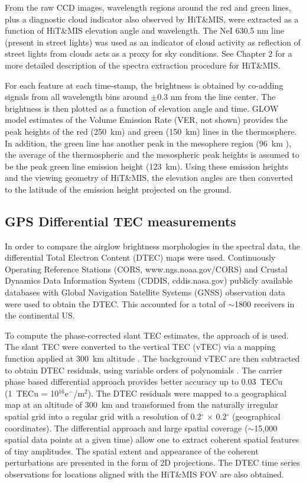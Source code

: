 \documentclass[crop=false,class=mitthesis,oneside,font=12pt]{standalone}
\begin{document}
From the raw CCD images, wavelength regions around the red and green lines, plus a diagnostic cloud indicator also observed by HiT\&MIS, were extracted as a function of HiT\&MIS elevation angle and wavelength.  The NeI 630.5 nm line (present in street lights) was used as an indicator of cloud activity as reflection of street lights from clouds acts as a proxy for sky conditions. See Chapter 2 for a more detailed description of the spectra extraction procedure for HiT\&MIS.

For each feature at each time-stamp, the brightness is obtained by co-adding signals from all wavelength bins around $\pm$0.3 nm from the line center. The brightness is then plotted as a function of elevation angle and time. GLOW \citep{solomon_1988,solomon1989630,bailey2002} model estimates of the Volume Emission Rate (VER, not shown) provides the peak heights of the red (250~km) and green (150~km) lines in the thermosphere. In addition, the green line has another peak in the mesophere region (96~km \citep{yee1987}), the average of the thermospheric and the mesospheric peak heights is assumed to be the peak green line emission height (123~km). Using these emission heights and the viewing geometry of HiT\&MIS, the elevation angles are then converted to the latitude of the emission height projected on the ground. 

\subsection{GPS Differential TEC measurements}
\label{tec}
In order to compare the airglow brightness morphologies in the spectral data, the differential Total Electron Content (DTEC) maps were used. Continuously Operating Reference Stations (CORS, www.ngs.noaa.gov/CORS) and Crustal Dynamics Data Information System (CDDIS, cddis.nasa.gov) publicly available databases with Global Navigation Satellite Systems (GNSS) observation data were used to obtain the DTEC. This accounted for a total of  $\sim$1800 receivers in the continental US. 

To compute the phase-corrected slant TEC estimates, the approach of \cite{Coster1992} is used. The slant TEC were converted to the vertical TEC (vTEC) via a mapping function applied at 300~km altitude \citep{Klobuchar1987}. The background vTEC are then subtracted to obtain DTEC residuals, using variable orders of polynomials \citep{Mrak2018}. The carrier phase based differential approach provides better accuracy up to 0.03~TECu \citep{Coster2012} (1~TECu = 10$^{16}$e$^-$/m$^2$). The DTEC residuals were mapped to a geographical map at an altitude of 300~km and transformed from the naturally irregular spatial grid into a regular grid \citep[e.g.,][]{Azeem2015, Mrak2018} with a resolution of 0.2$^\circ$ $\times$ 0.2$^\circ$ (geographical coordinates). The differential approach and large spatial coverage ($\sim$15,000 spatial data points at a given time) allow one to extract coherent spatial features of tiny amplitudes. The spatial extent and appearance of the coherent perturbations are presented in the form of 2D projections. The DTEC time series observations for locations aligned with the HiT\&MIS FOV are also obtained. 
\end{document}

